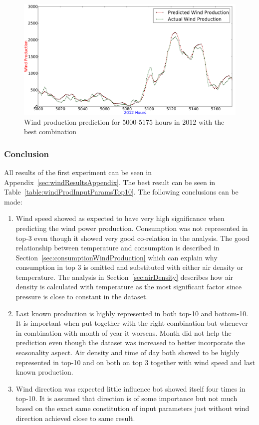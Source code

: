 \begin{figure}[H]
\centering
\includegraphics[width=0.99\linewidth]{billeder/bestInputParameterLowNumbers.png}
\caption{Wind production prediction for 5000-5175 hours in 2012 with the best combination}
\label{fig:bestInputParameterLowNumbers}
\end{figure}   

\subsubsection{Conclusion}
All results of the first experiment can be seen in Appendix~\ref{sec:windResultsAppendix}. The best result can be seen in Table~\ref{table:windProdInputParamsTop10}. The following conclusions can be made: 

\begin{enumerate}
\item Wind speed showed as expected to have very high significance when predicting the wind power production. Consumption was not represented in top-3 even though it showed very good co-relation in the analysis. The good relationship between temperature and consumption is described in Section~\ref{sec:consumptionWindProduction} which can explain why consumption in top 3 is omitted and substituted with either air density or temperature. The analysis in Section~\ref{sec:airDensity} describes how air density is calculated with temperature as the most significant factor since pressure is close to constant in the dataset.   
\item Last known production is highly represented in both top-10 and bottom-10. It is important when put together with the right combination but whenever in combination with month of year it worsens. Month did not help the prediction even though the dataset was increased to better incorporate the seasonality aspect. Air density and time of day both showed to be highly represented in top-10 and on both on top 3 together with wind speed and last known production.
\item Wind direction was expected little influence bot showed itself four times in top-10. It is assumed that direction is of some importance but not much based on the exact same constitution of input parameters just without wind direction achieved close to same result.
\end{enumerate}

